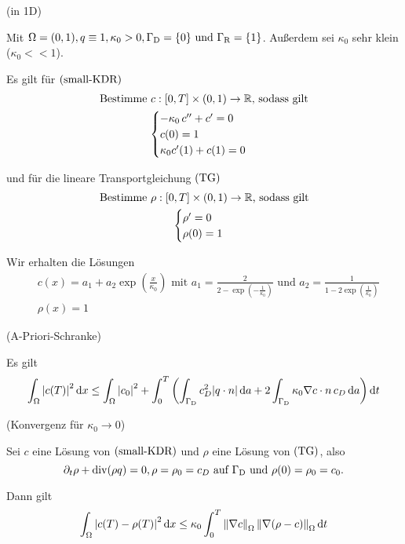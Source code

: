\begin{examples}(in 1D)
	\label{1D-Bsp}

	Mit $ \Omega = (0,1), q \equiv 1, \kappa_0 > 0, \Gamma_{\text{D}} = \{0\} \text{ und } \Gamma_{\text{R}} = \{1\}$. Außerdem sei $ \kappa_0 $ sehr klein ($ \kappa_0 << 1 $).
	
	Es gilt für $ \operatorname{(small-KDR)} $
	\begin{gather*}
	\text{Bestimme }  c:[0,T] \times (0,1) \to \mathbb{R} \text{, sodass gilt}\\
	\begin{cases}
		-\kappa_0 \, c'' + c' = 0 \\
		c(0) = 1  \\
		\kappa_0 c'(1) + c(1) = 0
	\end{cases}
	\end{gather*}
	
	und für die lineare Transportgleichung $ \operatorname{(TG)} $
	\begin{gather}
		\text{Bestimme } \rho:[0,T] \times (0,1) \to \mathbb{R} \text{, sodass gilt}\\
		\begin{cases}
			\rho' = 0\\
			\rho(0) = 1
		\end{cases}
	\end{gather}
	
	Wir erhalten die Lösungen
	\begin{align*}
		&c(x) = a_1 + a_2 \exp(\frac{x}{\kappa_0}) \text{ mit } a_1 = \frac{2}{2 - \exp(- \frac{1}{\kappa_0})} \text{ und } a_2 = \frac{1}{1 - 2 \exp(\frac{1}{\kappa_0})}\\
		&\rho(x) = 1
	\end{align*}
\end{examples}

\begin{Lemma}(A-Priori-Schranke)
	
	Es gilt
	\begin{align*}
		\int_\Omega \abs{c(T)}^2 \mathop{}\!\mathrm{d} x \leq \int_\Omega \abs{c_0}^2 + \int_{0}^{T} \left( \int_{\Gamma_{\text{D}}} c_D^2 \abs{q \cdot n} \mathop{}\!\mathrm{d} a + 2 \int_{\Gamma_{\text{D}}} \kappa_0 \nabla c \cdot n \, c_D \mathop{}\!\mathrm{d} a\right) \mathop{}\!\mathrm{d} t
	\end{align*}
\end{Lemma}

\begin{Lemma}(Konvergenz für $ \kappa_0 \to 0 $)
	
	Sei $ c $ eine Lösung von $ \operatorname{(small-KDR)} $ und $ \rho $ eine Lösung von $ \operatorname{(TG)} $, also 
	\[ \partial_t \rho + \operatorname{div}(\rho q) = 0, \rho = \rho_0 = c_D \text{ auf } \Gamma_{\text{D}} \text{ und }  \rho(0) = \rho_0 = c_0.  \]
	
	Dann gilt 
	\[ \int_\Omega \abs{c(T) - \rho(T)}^2 \mathop{}\!\mathrm{d} x \leq \kappa_0 \int_{0}^{T} \norm{\nabla c}_\Omega\, \norm{\nabla(\rho - c)}_\Omega \mathop{}\!\mathrm{d} t \]
\end{Lemma}

